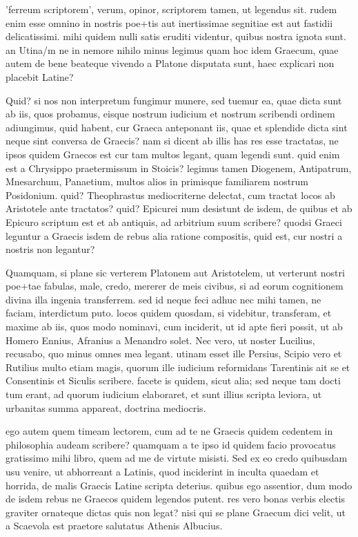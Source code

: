  'ferreum scriptorem', verum, opinor, scriptorem tamen, ut legendus sit. rudem enim esse omnino in nostris poe+tis aut inertissimae segnitiae est aut fastidii delicatissimi. mihi quidem nulli satis eruditi videntur, quibus nostra ignota sunt. an Utina/m ne in nemore nihilo minus legimus quam hoc idem Graecum, quae autem de bene beateque vivendo a Platone disputata sunt, haec explicari non placebit Latine?

 Quid? si nos non interpretum fungimur munere, sed tuemur ea, quae dicta sunt ab iis, quos probamus, eisque nostrum iudicium et nostrum scribendi ordinem adiungimus, quid habent, cur Graeca anteponant iis, quae et splendide dicta sint neque sint conversa de Graecis? nam si dicent ab illis has res esse tractatas, ne ipsos quidem Graecos est cur tam multos legant, quam legendi sunt. quid enim est a Chrysippo praetermissum in Stoicis? legimus tamen Diogenem, Antipatrum, Mnesarchum, Panaetium, multos alios in primisque familiarem nostrum Posidonium. quid? Theophrastus mediocriterne delectat, cum tractat locos ab Aristotele ante tractatos? quid? Epicurei num desistunt de isdem, de quibus et ab Epicuro scriptum est et ab antiquis, ad arbitrium suum scribere? quodsi Graeci leguntur a Graecis isdem de rebus alia ratione compositis, quid est, cur nostri a nostris non legantur?

 Quamquam, si plane sic verterem Platonem aut Aristotelem, ut verterunt nostri poe+tae fabulas, male, credo, mererer de meis civibus, si ad eorum cognitionem divina illa ingenia transferrem. sed id neque feci adhuc nec mihi tamen, ne faciam, interdictum puto. locos quidem quosdam, si videbitur, transferam, et maxime ab iis, quos modo nominavi, cum inciderit, ut id apte fieri possit, ut ab Homero Ennius, Afranius a Menandro solet. Nec vero, ut noster Lucilius, recusabo, quo minus omnes mea legant. utinam esset ille Persius, Scipio vero et Rutilius multo etiam magis, quorum ille iudicium reformidans Tarentinis ait se et Consentinis et Siculis scribere. facete is quidem, sicut alia; sed neque tam docti tum erant, ad quorum iudicium elaboraret, et sunt illius scripta leviora, ut urbanitas summa appareat, doctrina mediocris.

 ego autem quem timeam lectorem, cum ad te ne Graecis quidem cedentem in philosophia audeam scribere? quamquam a te ipso id quidem facio provocatus gratissimo mihi libro, quem ad me de virtute misisti. Sed ex eo credo quibusdam usu venire, ut abhorreant a Latinis, quod inciderint in inculta quaedam et horrida, de malis Graecis Latine scripta deterius. quibus ego assentior, dum modo de isdem rebus ne Graecos quidem legendos putent. res vero bonas verbis electis graviter ornateque dictas quis non legat? nisi qui se plane Graecum dici velit, ut a Scaevola est praetore salutatus Athenis Albucius.

